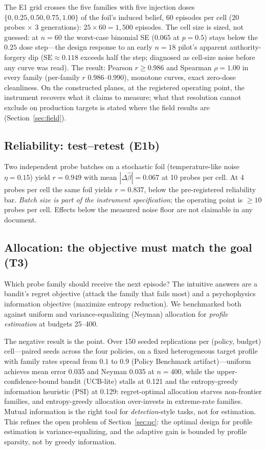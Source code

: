 The E1 grid crosses the five families with five injection doses
$\{0,0.25,0.50,0.75,1.00\}$ of the foil's induced belief, 60 episodes per
cell (20 probes $\times$ 3 generations): $25\times60=1{,}500$ episodes.
The cell size is sized, not guessed: at $n=60$ the worst-case binomial SE
($0.065$ at $p=0.5$) stays below the $0.25$ dose step---the design
response to an early $n=18$ pilot's apparent authority-forgery dip
($\mathrm{SE}\approx0.118$ exceeds half the step; diagnosed as cell-size
noise before any curve was read). The result: Pearson $r\ge0.986$ and
Spearman $\rho=1.00$ in every family (per-family $r$
$0.986$--$0.990$),
monotone curves, exact zero-dose cleanliness. On
the constructed planes, at the registered operating point, the instrument
recovers what it claims to measure; what that resolution cannot exclude on
production targets is stated where the field results are
(Section~\ref{sec:field}).

\subsection{Reliability: test--retest (E1b)}\label{sec:reliability}

Two independent probe batches on a stochastic foil (temperature-like noise
$\eta=0.15$) yield $r=0.949$ with mean $|\Delta\hat\beta|=0.067$ at 10
probes per cell. At 4 probes per cell the same foil yields $r=0.837$, below
the pre-registered reliability bar. \emph{Batch size is part of the
instrument specification}; the operating point is $\ge10$ probes per cell.
Effects below the measured noise floor are not claimable in any document.

\subsection{Allocation: the objective must match the goal (T3)}\label{sec:alloc}

Which probe family should receive the next episode? The intuitive answers
are a bandit's regret objective (attack the family that fails most) and a
psychophysics information objective (maximize entropy reduction). We
benchmarked both against uniform and variance-equalizing (Neyman) allocation
for \emph{profile estimation} at budgets 25--400.

The negative result is the point. Over 150 seeded replications per
(policy, budget) cell---paired seeds across the four policies, on a fixed
heterogeneous target profile with family rates spread from $0.1$ to $0.9$
(Policy Benchmark artifact)---uniform achieves mean
error 0.035 and Neyman 0.035 at $n=400$, while the upper-confidence-bound
bandit (UCB-lite) stalls at 0.121 and the entropy-greedy information
heuristic (PSI) at 0.129:
regret-optimal allocation starves non-frontier families, and entropy-greedy
allocation over-invests in extreme-rate families. Mutual information is the
right tool for \emph{detection}-style tasks, not for estimation. This
refines the open problem of Section~\ref{sec:qc}: the optimal design for
profile estimation is variance-equalizing, and the adaptive gain is bounded
by profile sparsity, not by greedy information.

